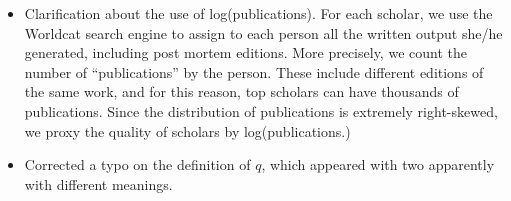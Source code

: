 \begin{itemize}
\item Clarification about the use of log(publications). For each scholar, we use the Worldcat search engine to assign to each person all the written output she/he generated, including post mortem editions. More precisely, we count the number of ``publications'' by the person. These include different editions of the same work, and for this reason, top scholars can have thousands of publications. Since the distribution of publications is extremely right-skewed, we proxy the quality of scholars by log(publications.)


 \item Corrected a typo on the definition of $q$, which appeared with two apparently with different meanings.
\end{itemize}

